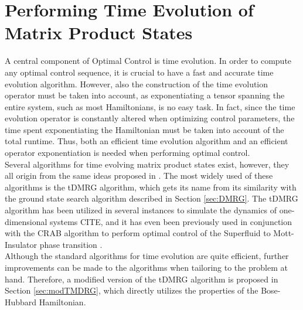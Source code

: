 \chapter{Performing Time Evolution of Matrix Product States}
A central component of Optimal Control is time evolution. In order to compute any optimal control sequence, it is crucial to have a fast and accurate time evolution algorithm. However, also the construction of the time evolution operator must be taken into account, as exponentiating a tensor spanning the entire system, such as most Hamiltonians, is no easy task. In fact, since the time evolution operator is constantly altered when optimizing control parameters, the time spent exponentiating the Hamiltonian must be taken into account of the total runtime. Thus, both an efficient time evolution algorithm and an efficient operator exponentiation is needed when performing optimal control.\\
Several algorithms for time evolving matrix product states exist, however, they all origin from the same ideas proposed in \cite{Vidal2003,Vidal2004}. The most widely used of these algorithms is the tDMRG algorithm, which gets its name from its similarity with the ground state search algorithm described in Section \ref{sec:DMRG}. The tDMRG algorithm has been utilized in several instances to simulate the dynamics of one-dimensional systems CITE, and it has even been previously used in conjunction with the CRAB algorithm to perform optimal control of the Superfluid to Mott-Insulator phase transition \cite{FrankBloch,Doria2011}.\\
Although the standard algorithms for time evolution are quite efficient, further improvements can be made to the algorithms when tailoring to the problem at hand. Therefore, a modified version of the tDMRG algorithm is proposed in Section \ref{sec:modTMDRG}, which directly utilizes the properties of the Bose-Hubbard Hamiltonian.


